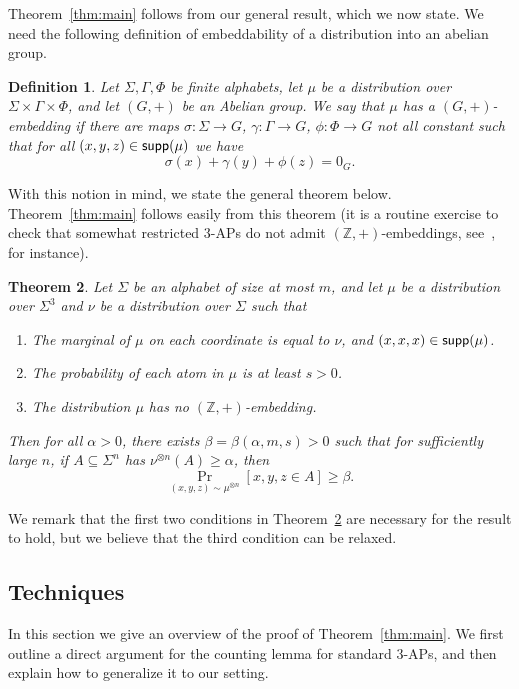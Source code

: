 \documentclass[10pt,a4paper]{amsart}
\newtheorem{thm}{Theorem}[section]
\newtheorem{definition}[thm]{Definition}
\newcommand\Prob[2]{{\Pr_{#1}\left[ {#2} \right]}}
\renewcommand\geq{\geqslant}
\begin{document}
Theorem~\ref{thm:main} follows from our general result, which we now state. We need the following definition of embeddability of a distribution into an abelian group.
\begin{definition}
    Let $\Sigma,\Gamma,\Phi$ be finite alphabets, let $\mu$ be a distribution over $\Sigma\times\Gamma\times\Phi$, and let $(G,+)$ be an Abelian group. We say that $\mu$ has a $(G,+)$-embedding if there are maps $\sigma\colon \Sigma\to G$, $\gamma\colon \Gamma\to G$, $\phi\colon \Phi\to G$ not all constant such that for all $(x,y,z)\in{\sf supp}(\mu)$ we have
    \[
    \sigma(x)+\gamma(y)+\phi(z) = 0_G.
    \]
\end{definition}
With this notion in mind, we state the general theorem below.  Theorem~\ref{thm:main} follows easily from this theorem (it is a routine exercise to check that somewhat restricted $3$-APs do not admit $(\mathbb{Z},+)$-embeddings, see~\cite{BKM3AP}, for instance).


\begin{thm}\label{thm:main_2}
    Let $\Sigma$ be an alphabet of size at most $m$, and let $\mu$ be a distribution over $\Sigma^3$ and $\nu$ be a distribution over $\Sigma$ such that 
    \begin{enumerate}
        \item The marginal of $\mu$ on each coordinate is equal to $\nu$, and $(x,x,x)\in {\sf supp}(\mu)$.
        \item The probability of each atom in $\mu$ is at least $s>0$.
        \item The distribution $\mu$ has no $(\mathbb{Z},+)$-embedding.
    \end{enumerate}
    Then for all $\alpha>0$, there exists $\beta = \beta(\alpha,m,s)>0$ such that for sufficiently large $n$, if $A\subseteq \Sigma^n$ has 
    $\nu^{\otimes n}(A)\geq \alpha$, then
    \[
    \Prob{(x,y,z)\sim\mu^{\otimes n}}{x,y,z\in A}\geq \beta.
    \]
\end{thm}

We remark that the first two conditions in Theorem~\ref{thm:main_2} are necessary for the result to hold, but we believe that the third condition can be relaxed.

\subsection{Techniques}\label{sec:techniques}
In this section we give an overview of the proof of Theorem~\ref{thm:main}. We first outline a direct argument for the counting lemma for standard $3$-APs, and then explain how to generalize it to our setting.
\end{document}
